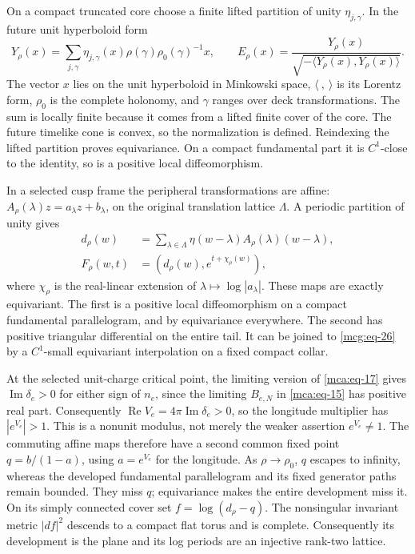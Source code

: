 On a compact truncated core choose a finite lifted partition of unity
\(\eta_{j,\gamma}\). In the future unit hyperboloid form \begin{equation}\label{mcg:eq-26}
Y_\rho(x)=\sum_{j,\gamma}\eta_{j,\gamma}(x)
                \rho(\gamma)\rho_0(\gamma)^{-1}x,\qquad
 E_\rho(x)=\frac{Y_\rho(x)}
                    {\sqrt{-\langle Y_\rho(x),Y_\rho(x)\rangle}} .
\end{equation} The vector $x$ lies on the unit hyperboloid in Minkowski space,
$\langle\ ,\ \rangle$ is its Lorentz form, $\rho_0$ is the complete
holonomy, and $\gamma$ ranges over deck transformations. The sum is
locally finite because it comes from a lifted finite cover of the core.
The future timelike cone is convex, so the normalization is defined.
Reindexing the lifted partition proves equivariance. On a
compact fundamental part it is \(C^1\)-close to the identity, so is a
positive local diffeomorphism.

In a selected cusp frame the peripheral transformations are affine:
\(A_\rho(\lambda)z=a_\lambda z+b_\lambda\), on the original translation
lattice \(\Lambda\). A periodic partition of unity gives \begin{equation}\label{mcg:eq-27}
\begin{aligned}
d_\rho(w)&=\sum_{\lambda\in\Lambda}
   \eta(w-\lambda)A_\rho(\lambda)(w-\lambda),\\
F_\rho(w,t)&=(d_\rho(w),e^{t+\chi_\rho(w)}),
\end{aligned}
\end{equation} where \(\chi_\rho\) is the real-linear extension of
\(\lambda\mapsto\log|a_\lambda|\). These maps are exactly equivariant.
The first is a positive local diffeomorphism on a compact fundamental
parallelogram, and by equivariance everywhere. The second has positive
triangular differential on the entire tail. It can be joined to
\eqref{mcg:eq-26} by a \(C^1\)-small equivariant interpolation on a
fixed compact collar.

At the selected unit-charge critical point, the limiting version of
\eqref{mca:eq-17} gives \(\operatorname{Im}\delta_e>0\) for either sign
of \(n_e\), since the limiting \(B_{e,N}\) in \eqref{mca:eq-15} has positive real part. Consequently
\(\operatorname{Re}V_e=4\pi\operatorname{Im}\delta_e>0\), so the
longitude multiplier has \(|e^{V_e}|>1\). This is a nonunit
modulus, not merely the weaker assertion \(e^{V_e}\ne1\). The
commuting affine maps therefore have a second common fixed point
\(q=b/(1-a)\), using \(a=e^{V_e}\) for the longitude. As
\(\rho\to\rho_0\), \(q\) escapes to infinity, whereas the developed
fundamental parallelogram and its fixed generator paths remain bounded.
They miss \(q\); equivariance makes the entire development miss it. On
its simply connected cover set \(f=\log(d_\rho-q)\). The nonsingular
invariant metric \(|df|^2\) descends to a compact flat torus and is
complete. Consequently its development is the plane and its log periods
are an injective rank-two lattice.

